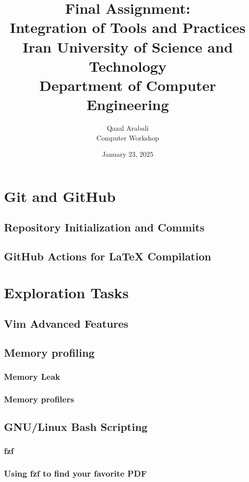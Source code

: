 \documentclass[12pt]{article}
\title{
    \vspace{2in}
    \textbf{Final Assignment:}\\
    \textbf{Integration of Tools and Practices}\\
    \large Iran University of Science and Technology\\
    \large Department of Computer Engineering\\
    \vspace{2in}
}
\author{
    \vspace{0.5in}
    Qazal Arabali\\
    Computer Workshop\\
    \vspace{0.5in}
}
\date{January 23, 2025}
\begin{document}
\begin{titlepage}
    \maketitle
    \thispagestyle{empty}
\end{titlepage}

\newpage

\tableofcontents
\newpage

\section*{Git and GitHub}
    \subsection*{Repository Initialization and Commits}
    \subsection*{GitHub Actions for LaTeX Compilation}

\section*{Exploration Tasks}
    \subsection*{Vim Advanced Features}
    
    \subsection*{Memory profiling}
        \subsubsection*{Memory Leak}
        \subsubsection*{Memory profilers}

    \subsection*{GNU/Linux Bash Scripting}
        \subsubsection*{fzf}
        \subsubsection*{Using fzf to find your favorite PDF}
\end{document}
